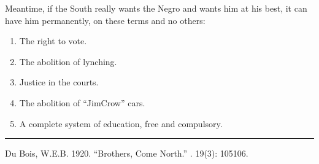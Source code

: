 \documentclass[letterpaper,10pt,english]{jupyterBook}
\begin{document}
\sphinxAtStartPar
Meantime, if the South really wants the Negro and wants him at his best, it can have him permanently, on these terms and no others:
\begin{enumerate}
%
\item {} 
\sphinxAtStartPar
The right to vote.

\item {} 
\sphinxAtStartPar
The abolition of lynching.

\item {} 
\sphinxAtStartPar
Justice in the courts.

\item {} 
\sphinxAtStartPar
The abolition of “Jim\sphinxhyphen{}Crow” cars.

\item {} 
\sphinxAtStartPar
A complete system of education, free and compulsory.

\end{enumerate}


\bigskip\hrule\bigskip


\sphinxAtStartPar
{} Du Bois, W.E.B. 1920. “Brothers, Come North.” . 19(3): 105\sphinxhyphen{}106.
\end{document}
